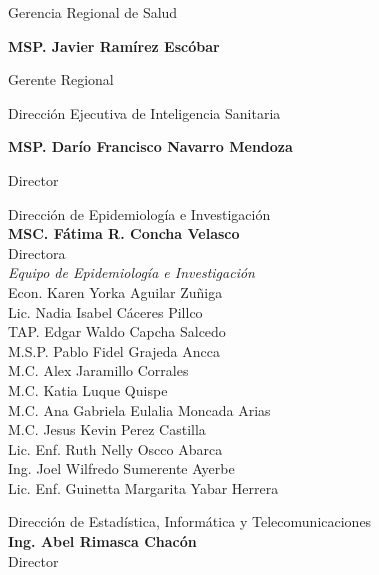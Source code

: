 \documentclass[12pt,a4paper,openany]{book}
\begin{document}
	
	\begin{center}
	
		{\large Gerencia Regional de Salud}
		
		\textbf{MSP. Javier Ramírez Escóbar}
		
		Gerente Regional \vspace{1.0cm}
		
		Dirección Ejecutiva de Inteligencia Sanitaria
		
		\textbf{MSP. Darío Francisco Navarro Mendoza}
		
		Director
		
		\vspace{1.5cm}
\noindent
\begin{minipage}[t]{.45\textwidth}
	\centering
	Dirección de Epidemiología e Investigación  \\
	\textbf{MSC. Fátima R. Concha Velasco}\\
	Directora \vspace{1.0cm}\\
	\textit{Equipo de Epidemiología e Investigación }\vspace{.5cm}\\
	Econ. Karen Yorka Aguilar Zuñiga \\
	Lic. Nadia Isabel Cáceres Pillco \\
	TAP. Edgar Waldo Capcha Salcedo \\
	M.S.P. Pablo Fidel Grajeda Ancca \\
	M.C. Alex Jaramillo Corrales \\ 
	M.C. Katia Luque Quispe \\
	M.C. Ana Gabriela Eulalia Moncada Arias \\
	M.C. Jesus Kevin Perez Castilla \\
	Lic. Enf. Ruth Nelly Oscco Abarca \\
	Ing. Joel Wilfredo Sumerente Ayerbe \\
	Lic. Enf. Guinetta Margarita Yabar Herrera \vspace{1.5cm}\\	
\end{minipage}
\hfill
\noindent
\begin{minipage}[t]{.45\textwidth}
	\centering
	Dirección de Estadística, Informática y Telecomunicaciones\\
	\textbf{Ing. Abel Rimasca Chacón} \\
	Director \vspace{1.0cm} \\

\end{minipage}
\end{center}
\end{document}
